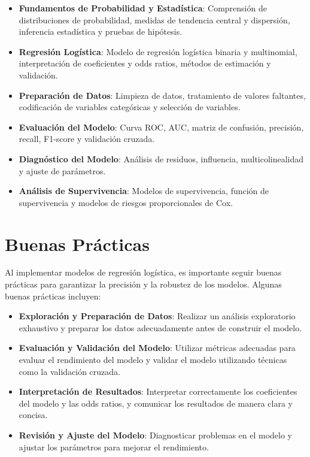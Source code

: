 \documentclass[a4paper]{report} %
\begin{document}
\begin{itemize}
    \item \textbf{Fundamentos de Probabilidad y Estad\'istica}: Comprensi\'on de distribuciones de probabilidad, medidas de tendencia central y dispersi\'on, inferencia estad\'istica y pruebas de hip\'otesis.
    \item \textbf{Regresi\'on Log\'istica}: Modelo de regresi\'on log\'istica binaria y multinomial, interpretaci\'on de coeficientes y odds ratios, m\'etodos de estimaci\'on y validaci\'on.
    \item \textbf{Preparaci\'on de Datos}: Limpieza de datos, tratamiento de valores faltantes, codificaci\'on de variables categ\'oricas y selecci\'on de variables.
    \item \textbf{Evaluaci\'on del Modelo}: Curva ROC, AUC, matriz de confusi\'on, precisi\'on, recall, F1-score y validaci\'on cruzada.
    \item \textbf{Diagn\'ostico del Modelo}: An\'alisis de residuos, influencia, multicolinealidad y ajuste de par\'ametros.
    \item \textbf{An\'alisis de Supervivencia}: Modelos de supervivencia, funci\'on de supervivencia y modelos de riesgos proporcionales de Cox.
\end{itemize}

\section{Buenas Pr\'acticas}

Al implementar modelos de regresi\'on log\'istica, es importante seguir buenas pr\'acticas para garantizar la precisi\'on y la robustez de los modelos. Algunas buenas pr\'acticas incluyen:

\begin{itemize}
    \item \textbf{Exploraci\'on y Preparaci\'on de Datos}: Realizar un an\'alisis exploratorio exhaustivo y preparar los datos adecuadamente antes de construir el modelo.
    \item \textbf{Evaluaci\'on y Validaci\'on del Modelo}: Utilizar m\'etricas adecuadas para evaluar el rendimiento del modelo y validar el modelo utilizando t\'ecnicas como la validaci\'on cruzada.
    \item \textbf{Interpretaci\'on de Resultados}: Interpretar correctamente los coeficientes del modelo y las odds ratios, y comunicar los resultados de manera clara y concisa.
    \item \textbf{Revisi\'on y Ajuste del Modelo}: Diagnosticar problemas en el modelo y ajustar los par\'ametros para mejorar el rendimiento.
\end{itemize}
\end{document}

